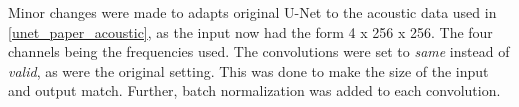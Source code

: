     
    Minor changes were made to adapt\citeauthor{unet_ronneberger2015}s original U-Net to the acoustic data used in \ref{unet_paper_acoustic}, as the input now had the form 4 x 256 x 256. The four channels being the frequencies used. The convolutions were set to \textit{same} instead of \textit{valid}, as were the original setting. This was done to make the size of the input and output match. Further, batch normalization was added to each convolution. 
    


        

    
    